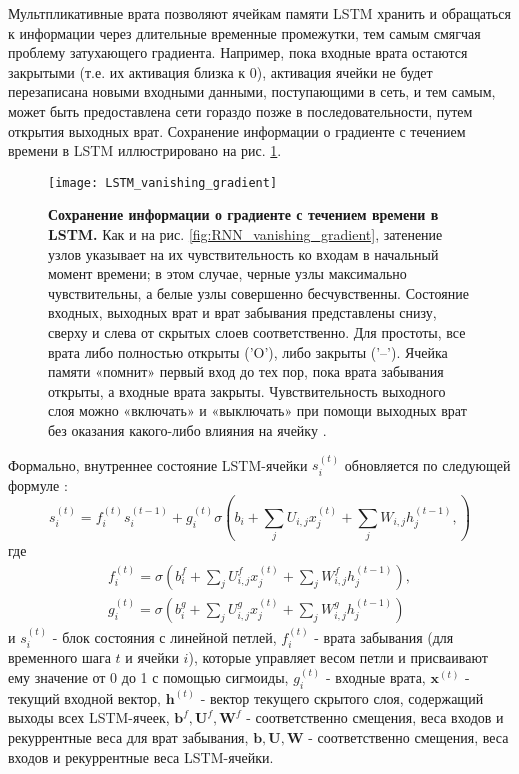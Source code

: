 Мультпликативные врата позволяют ячейкам памяти LSTM хранить и обращаться 
к информации через длительные временные промежутки, тем самым 
смягчая проблему затухающего градиента. Например, пока входные врата 
остаются закрытыми (т.е. их активация близка к 0), 
активация ячейки не будет перезаписана новыми входными данными, поступающими 
в сеть, и тем самым, может быть предоставлена сети гораздо позже в 
последовательности, путем открытия выходных врат. Сохранение информации о 
градиенте с течением времени в LSTM иллюстрировано на рис. \ref{fig:LSTM_vanishing_gradient}.

\begin{figure}[h!]
    \centering
    \texttt{[image: LSTM\_vanishing\_gradient]}
    \caption{\textbf{Сохранение информации о 
    градиенте с течением времени в LSTM.} Как и на рис. 
    \ref{fig:RNN_vanishing_gradient}, затенение узлов указывает на 
    их чувствительность ко входам в начальный момент времени; в 
    этом случае, черные узлы максимально чувствительны, а 
    белые узлы совершенно бесчувственны. Состояние 
    входных, выходных врат и врат забывания представлены 
    снизу, сверху и слева от скрытых слоев соответственно. Для 
    простоты, все врата либо полностью открыты ('O'), либо закрыты ('--'). 
    Ячейка памяти «помнит» первый вход до тех пор, пока врата забывания 
    открыты, а входные врата закрыты. Чувствительность выходного слоя 
    можно «включать» и «выключать» при помощи выходных врат без оказания 
    какого-либо влияния на ячейку \cite{graves}.}
    \label{fig:LSTM_vanishing_gradient}
\end{figure}

\newpage

Формально, внутреннее состояние LSTM-ячейки $s_i^{(t)}$ обновляется по следующей 
формуле \cite{Goodfellow-et-al-2016}:
\begin{equation*}
    s_i^{(t)} = f_i^{(t)} s_i^{(t-1)} + g_i^{(t)} \sigma \left( 
        b_i + \sum_j U_{i,j} x_j^{(t)} + \sum_j W_{i,j} h_j^{(t-1)},
    \right)
\end{equation*}
где\vspace{-5pt}
\begin{gather*}
    f_i^{(t)} = \sigma \left( 
        b_i^f + \sum_j U_{i,j}^f x_j^{(t)} + \sum_j W_{i,j}^f h_j^{(t-1)}
    \right), \\[0.5em]
    g_i^{(t)} = \sigma \left( 
        b_i^g + \sum_j U_{i,j}^g x_j^{(t)} + \sum_j W_{i,j}^g h_j^{(t-1)}
    \right)
\end{gather*}
и
$s_i^{(t)}$ - блок состояния с линейной петлей, 
$f_i^{(t)}$ - врата забывания (для временного шага $t$ и ячейки $i$), 
которые управляет весом петли и присваивают ему значение от 0 до 1 с помощью 
сигмоиды,
$g_i^{(t)}$ - входные врата,
$\bm{x}^{(t)}$ - текущий входной вектор,
$\bm{h}^{(t)}$ - вектор текущего скрытого слоя, содержащий выходы всех LSTM-ячеек,
$\bm{b}^f, \bm{U}^f, \bm{W}^f$ - соответственно смещения, веса входов и рекуррентные веса для врат забывания,
$\bm{b}, \bm{U}, \bm{W}$ - соответственно смещения, веса входов и рекуррентные веса LSTM-ячейки. 

